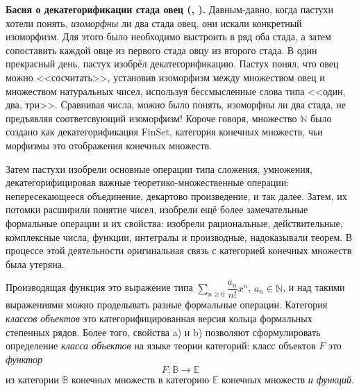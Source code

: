 \documentclass{article}
\theoremstyle{definition}
\begin{document}
\textbf{Басня о декатегорификации стада овец (\cite{category_feynman},
\cite[Remark 6, page 11]{species}).}
Давным-давно, когда пастухи хотели понять, \textit{изоморфны} ли два стада овец,
они искали конкретный изоморфизм. Для этого было необходимо выстроить в ряд оба
стада, а затем сопоставить каждой овце из первого стада овцу из второго стада.
В один прекрасный день, пастух изобрёл декатегорификацию. Пастух понял, что овец
можно <<сосчитать>>, установив изоморфизм между множеством овец и множеством
натуральных чисел, используя бессмысленные слова типа <<один, два, три>>.
Сравнивая числа, можно было понять, изоморфны ли два стада, не предъявляя
соответсвующий изоморфизм! Короче говоря, множество \( \mathbb N \) было создано
как декатегорификация FinSet, категория конечных множеств, чьи морфизмы это
отображения конечных множеств.

Затем пастухи изобрели основные операции типа сложения, умножения,
декатегорифицировав важные теоретико-множественные операции: непересекающееся
объединение, декартово произведение, и так далее. Затем, их потомки расширили
понятие чисел, изобрели ещё более замечательные формальные операции и их
свойства: изобрели рациональные, действительные, комплексные числа, функции,
интегралы и производные, надоказывали теорем. В процессе этой деятельности
оригинальная связь с категорией конечных множеств была утеряна.

Производящая функция это выражение типа \( \sum_{n \geq 0} \dfrac{a_n}{n!} x^n
\), \( a_n \in \mathbb N \), и над такими выражениями можно проделывать разные
формальные операции. Категория \textit{классов объектов} это
категорифицированная версия кольца формальных степенных рядов. Более того,
свойства a) и b) позволяют сформулировать определение \textit{класса объектов}
на языке теории категорий: класс объектов \( F \) это \textit{функтор}
\[
    F \colon \mathbb B \to \mathbb E
\] 
из категории \( \mathbb B \) конечных множеств в категорию \( \mathbb E \)
конечных множеств \textit{и функций}.
\end{document}
